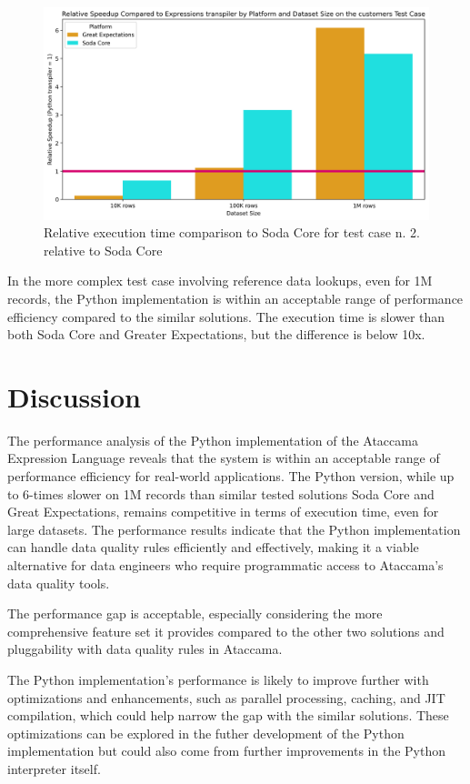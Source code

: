 \begin{figure}[htbp]
  \centering
  \includegraphics[width=1.0\columnwidth]{result-analysis/plots/relative_speedup_comparison_customers.png}
  \caption{Relative execution time comparison to Soda Core for test case n. 2. relative to Soda Core}
  \label{fig:time-comparison-customers-relative}
\end{figure}

In the more complex test case involving reference data lookups, even for 1M records, the Python implementation is within an acceptable range of performance efficiency compared to the similar solutions. The execution time is slower than both Soda Core and Greater Expectations, but the difference is below 10x. 

\section{Discussion}

The performance analysis of the Python implementation of the Ataccama Expression Language reveals that the system is within an acceptable range of performance efficiency for real-world applications. The Python version, while up to 6-times slower on 1M records than similar tested solutions Soda Core and Great Expectations, remains competitive in terms of execution time, even for large datasets. The performance results indicate that the Python implementation can handle data quality rules efficiently and effectively, making it a viable alternative for data engineers who require programmatic access to Ataccama's data quality tools.

The performance gap is acceptable, especially considering the more comprehensive feature set it provides compared to the other two solutions and pluggability with data quality rules in Ataccama. 

The Python implementation's performance is likely to improve further with optimizations and enhancements, such as parallel processing, caching, and JIT compilation, which could help narrow the gap with the similar solutions. These optimizations can be explored in the futher development of the Python implementation but could also come from further improvements in the Python interpreter itself.




